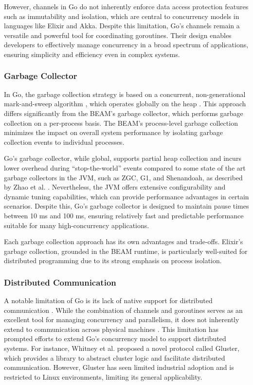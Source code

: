 However, channels in Go do not inherently enforce data access protection features such as immutability and isolation, which are central to concurrency models in languages like Elixir and Akka. Despite this limitation, Go’s channels remain a versatile and powerful tool for coordinating goroutines. Their design enables developers to effectively manage concurrency in a broad spectrum of applications, ensuring simplicity and efficiency even in complex systems.

\subsubsection{Garbage Collector}

In Go, the garbage collection strategy is based on a concurrent, non-generational mark-and-sweep algorithm \cite{go-docs}, which operates globally on the heap \cite{Zhao2023}. This approach differs significantly from the BEAM’s garbage collector, which performs garbage collection on a per-process basis. The BEAM’s process-level garbage collection minimizes the impact on overall system performance by isolating garbage collection events to individual processes.

Go’s garbage collector, while global, supports partial heap collection and incurs lower overhead during “stop-the-world” events compared to some state of the art garbage collectors in the JVM, such as ZGC, G1, and Shenandoah, as described by Zhao et al. \cite{Zhao2023}. Nevertheless, the JVM offers extensive configurability and dynamic tuning capabilities, which can provide performance advantages in certain scenarios. Despite this, Go’s garbage collector is designed to maintain pause times between 10 ms and 100 ms, ensuring relatively fast and predictable performance suitable for many high-concurrency applications.

Each garbage collection approach has its own advantages and trade-offs. Elixir’s garbage collection, grounded in the BEAM runtime, is particularly well-suited for distributed programming due to its strong emphasis on process isolation.

\subsubsection{Distributed Communication}

A notable limitation of Go is its lack of native support for distributed communication \cite{Whitney2019, Cox-Buday2017}. While the combination of channels and goroutines serves as an excellent tool for managing concurrency and parallelism, it does not inherently extend to communication across physical machines \cite{Kennedy2016}. This limitation has prompted efforts to extend Go’s concurrency model to support distributed systems. For instance, Whitney et al. \cite{Whitney2019} proposed a novel protocol called Gluster, which provides a library to abstract cluster logic and facilitate distributed communication. However, Gluster has seen limited industrial adoption and is restricted to Linux environments, limiting its general applicability.

